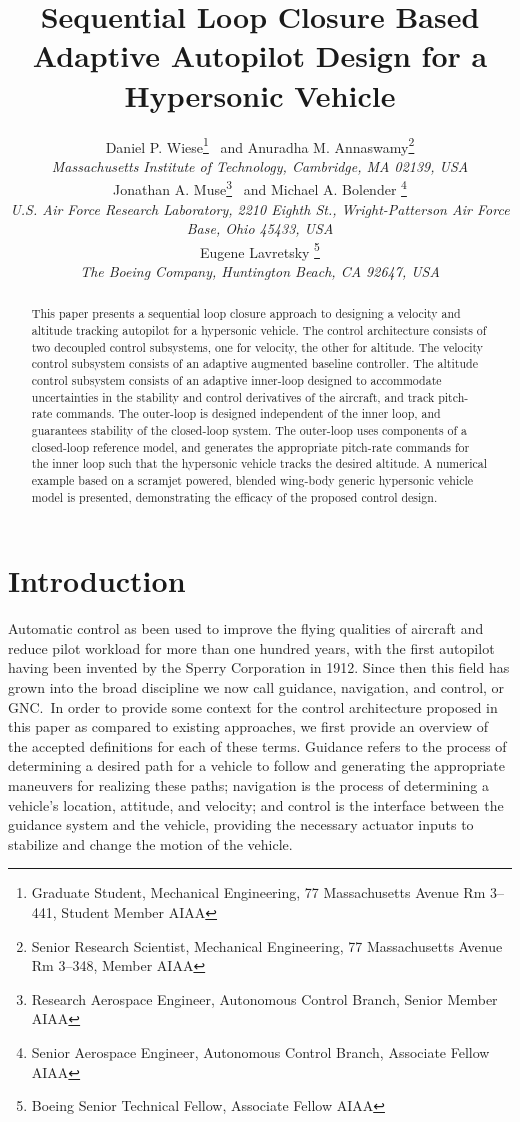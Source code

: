\documentclass[]{../sty/aiaa-tc}
\title{Sequential Loop Closure Based Adaptive Autopilot Design for a Hypersonic Vehicle}
\author{%
Daniel P. Wiese\thanks{Graduate Student, Mechanical Engineering, 77 Massachusetts Avenue Rm 3--441, Student Member AIAA}
\ and
Anuradha M. Annaswamy\thanks{Senior Research Scientist, Mechanical Engineering, 77 Massachusetts Avenue Rm 3--348, Member AIAA} \\
{\normalsize\itshape{}Massachusetts Institute of Technology, Cambridge, MA 02139, USA} \\[4pt]
Jonathan A. Muse\thanks{Research Aerospace Engineer, Autonomous Control Branch, Senior Member AIAA}
\ and
Michael A. Bolender \thanks{Senior Aerospace Engineer, Autonomous Control Branch, Associate Fellow AIAA} \\
{\normalsize\itshape{}U.S. Air Force Research Laboratory, 2210 Eighth St., Wright-Patterson Air Force Base, Ohio 45433, USA} \\
Eugene Lavretsky \thanks{Boeing Senior Technical Fellow, Associate Fellow AIAA} \\
{\normalsize\itshape{}The Boeing Company, Huntington Beach, CA 92647, USA}
}
\theoremstyle{examplestyle}
\begin{document}
  \maketitle

  \begin{abstract}
    This paper presents a sequential loop closure approach to designing a velocity and altitude tracking autopilot for a hypersonic vehicle.
    The control architecture consists of two decoupled control subsystems, one for velocity, the other for altitude.
    The velocity control subsystem consists of an adaptive augmented baseline controller.
    The altitude control subsystem consists of an adaptive inner-loop designed to accommodate uncertainties in the stability and control derivatives of the aircraft, and track pitch-rate commands.
    The outer-loop is designed independent of the inner loop, and guarantees stability of the closed-loop system.
    The outer-loop uses components of a closed-loop reference model, and generates the appropriate pitch-rate commands for the inner loop such that the hypersonic vehicle tracks the desired altitude.
    A numerical example based on a scramjet powered, blended wing-body generic hypersonic vehicle model is presented, demonstrating the efficacy of the proposed control design.
  \end{abstract}

  \section{Introduction}\label{sec.intro}

  Automatic control as been used to improve the flying qualities of aircraft and reduce pilot workload for more than one hundred years, with the first autopilot having been invented by the Sperry Corporation in 1912.
  Since then this field has grown into the broad discipline we now call guidance, navigation, and control, or GNC.\
  In order to provide some context for the control architecture proposed in this paper as compared to existing approaches, we first provide an overview of the accepted definitions for each of these terms.
  Guidance refers to the process of determining a desired path for a vehicle to follow and generating the appropriate maneuvers for realizing these paths;\cite{draper.apollo.1965} navigation is the process of determining a vehicle's location, attitude, and velocity; and control is the interface between the guidance system and the vehicle, providing the necessary actuator inputs to stabilize and change the motion of the vehicle.
\end{document}
